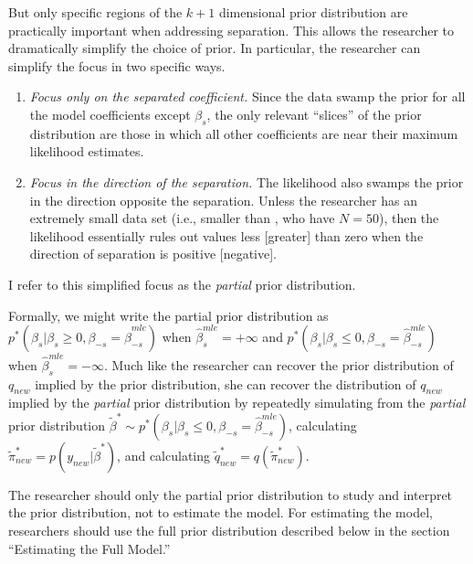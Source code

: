 \documentclass[12pt]{article}
\begin{document}
But only specific regions of the $k + 1$ dimensional prior distribution are practically important when addressing separation. 
This allows the researcher to dramatically simplify the choice of prior. 
In particular, the researcher can simplify the focus in two specific ways.
\begin{enumerate}
\item \emph{Focus only on the separated coefficient.} 
Since the data swamp the prior for all the model coefficients except $\beta_s$, the only relevant ``slices'' of the prior distribution are those in which all other coefficients are near their maximum likelihood estimates.
\item \emph{Focus in the direction of the separation.} 
The likelihood also swamps the prior in the direction opposite the separation. 
Unless the researcher has an extremely small data set (i.e., smaller than \cite{BarrilleauxRainey2014}, who have $N = 50$), then the likelihood essentially rules out values less [greater] than zero when the direction of separation is positive [negative].
\end{enumerate}
\noindent I refer to this simplified focus as the \emph{partial} prior distribution. 

Formally, we might write the partial prior distribution as $p^*(\beta_s | \beta_s \geq 0, \beta_{-s} = \hat{\beta}_{-s}^{mle})$ when $\hat{\beta}^{mle}_s = +\infty$ and $p^*(\beta_s | \beta_s \leq 0, \beta_{-s} = \hat{\beta}_{-s}^{mle})$ when $\hat{\beta}^{mle}_s = -\infty$.
Much like the researcher can recover the prior distribution of $q_{new}$ implied by the prior distribution, she can recover the distribution of $q_{new}$ implied by the \textit{partial} prior distribution by repeatedly simulating from the \textit{partial} prior distribution $\tilde{\beta}^* \sim p^*(\beta_s | \beta_s \leq 0, \beta_{-s} = \hat{\beta}_{-s}^{mle})$, calculating $\tilde{\pi}^*_{new} = p(y_{new}|\tilde{\beta}^*)$, and calculating $\tilde{q}^*_{new} = q(\tilde{\pi}^*_{new})$.

The researcher should only the partial prior distribution to study and interpret the prior distribution, not to estimate the model. 
For estimating the model, researchers should use the full prior distribution described below in the section ``Estimating the Full Model.''
\end{document}
